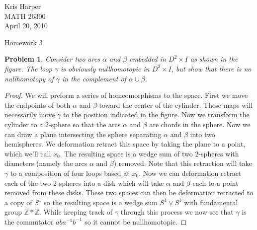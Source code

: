 \documentclass{article}
\newtheorem{problem}{Problem}
\begin{document}
\begin{flushright}
Kris Harper\\

MATH 26300\\

April 20, 2010
\end{flushright}

\begin{center}
Homework 3
\end{center}

\begin{problem}
Consider two arcs $\alpha$ and $\beta$ embedded in $D^2 \times I$ as shown in the figure. The loop $\gamma$ is obviously nullhomotopic in $D^2 \times I$, but show that there is no nullhomotopy of $\gamma$ in the complement of $\alpha \cup \beta$.
\end{problem}
\begin{proof}
We will preform a series of homeomorphisms to the space. First we move the endpoints of both $\alpha$ and $\beta$ toward the center of the cylinder. These maps will necessarily move $\gamma$ to the position indicated in the figure.
\vspace{100pt}
Now we transform the cylinder to a $2$-sphere so that the arcs $\alpha$ and $\beta$ are chords in the sphere. Now we can draw a plane intersecting the sphere separating $\alpha$ and $\beta$ into two hemispheres. We deformation retract this space by taking the plane to a point, which we'll call $x_0$. The resulting space is a wedge sum of two $2$-spheres with diameters (namely the arcs $\alpha$ and $\beta$) removed. Note that this retraction will take $\gamma$ to a composition of four loops based at $x_0$.
\vspace{100pt}
Now we can deformation retract each of the two $2$-spheres into a disk which will take $\alpha$ and $\beta$ each to a point removed from these disks. These two spaces can then be deformation retracted to a copy of $S^1$ so the resulting space is a wedge sum $S^1 \vee S^1$ with fundamental group $\mathbb{Z} * \mathbb{Z}$.
\vspace{100pt}
While keeping track of $\gamma$ through this process we now see that $\gamma$ is the commutator $aba^{-1}b^{-1}$ so it cannot be nullhomotopic.
\end{proof}
\end{document}
